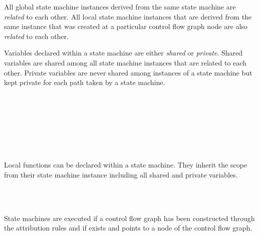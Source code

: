 All global state machine instances derived from the same state machine are
\textit{related} to each other. All local
state machine instances that are derived from the same instance that was
created at a particular control flow graph node are also \textit{related}
to each other.

Variables declared within a state machine are
either \textit{shared} or
\textit{private}. Shared variables are shared
among all state machine instances that are related to each other.
Private variables are never shared among instances of a state machine
but kept private for each path taken by a state machine.

\begin{grammar}
      \produces {} \\
      \produces {} \\
      \produces {}
	  \\
      \produces {}   \\
      \produces {} 
	 \lextoken{=}  \\
      \produces {} 
	  \\
      \produces {} 
	  \lextoken{=} 
\end{grammar}

\noindent
Local functions can be declared within a state machine.\label{sm-localfun}
They inherit the scope from their state machine instance including all shared and
private variables.

\begin{grammar}
      \produces {} \\
      \produces {} \\
      \produces {}
\end{grammar}

\noindent
State machines are executed if a control flow graph has been constructed through the attribution rules and if
 exists and points to a node of the
control flow graph.

